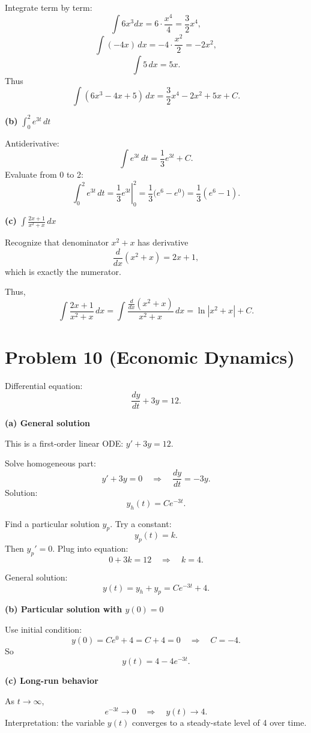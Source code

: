 \documentclass[12pt]{article}
\begin{document}
Integrate term by term:
\[
\int 6x^3 dx = 6\cdot \frac{x^4}{4} = \frac{3}{2}x^4,
\]
\[
\int (-4x)\,dx = -4\cdot \frac{x^2}{2} = -2x^2,
\]
\[
\int 5\,dx = 5x.
\]
Thus
\[
\int (6x^3 - 4x + 5)\, dx = \frac{3}{2}x^4 - 2x^2 + 5x + C.
\]

\textbf{(b)} \(\displaystyle \int_0^2 e^{3t}\, dt\)

Antiderivative:
\[
\int e^{3t}\, dt = \frac{1}{3}e^{3t} + C.
\]
Evaluate from 0 to 2:
\[
\int_0^2 e^{3t}\, dt = \left.\frac{1}{3}e^{3t}\right|_0^2
= \frac{1}{3}\big(e^{6} - e^{0}\big)
= \frac{1}{3}(e^{6} - 1).
\]

\textbf{(c)} \(\displaystyle \int \frac{2x + 1}{x^2 + x}\, dx\)

Recognize that denominator \(x^2 + x\) has derivative
\[
\frac{d}{dx}(x^2 + x) = 2x + 1,
\]
which is exactly the numerator.

Thus,
\[
\int \frac{2x + 1}{x^2 + x}\, dx
= \int \frac{\frac{d}{dx}(x^2 + x)}{x^2 + x}\, dx
= \ln|x^2 + x| + C.
\]



\section*{Problem 10 (Economic Dynamics)}

Differential equation:
\[
\frac{dy}{dt} + 3y = 12.
\]

\textbf{(a) General solution}

This is a first-order linear ODE: \(y' + 3y = 12\).

Solve homogeneous part:
\[
y' + 3y = 0 \quad \Rightarrow \quad \frac{dy}{dt} = -3y.
\]
Solution:
\[
y_h(t) = C e^{-3t}.
\]

Find a particular solution \(y_p\). Try a constant:
\[
y_p(t)=k.
\]
Then \(y_p' = 0\). Plug into equation:
\[
0 + 3k = 12 \quad \Rightarrow \quad k=4.
\]

General solution:
\[
y(t) = y_h + y_p = C e^{-3t} + 4.
\]

\textbf{(b) Particular solution with \(y(0)=0\)}

Use initial condition:
\[
y(0) = C e^{0} + 4 = C + 4 = 0 \quad \Rightarrow \quad C=-4.
\]
So
\[
y(t) = 4 - 4 e^{-3t}.
\]

\textbf{(c) Long-run behavior}

As \(t \to \infty\),
\[
e^{-3t} \to 0 \quad \Rightarrow \quad y(t) \to 4.
\]
Interpretation: the variable \(y(t)\) converges to a steady-state level of 4 over time.
\end{document}
